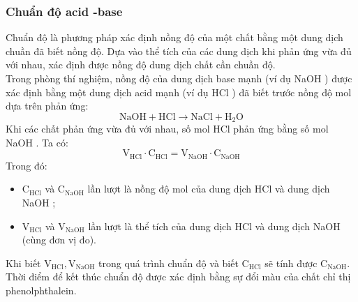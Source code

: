 \subsubsection{Chuẩn độ acid -base}
Chuẩn độ là phương pháp xác định nồng độ của một chất bằng một dung dịch chuần đã biết nồng độ. Dựa vào thể tích của các dung dịch khi phản ứng vừa đủ với nhau, xác định được nồng độ dung dịch chất cần chuần độ.
\\
Trong phòng thí nghiệm, nồng độ của dung dịch base mạnh (ví dụ NaOH ) được xác định bằng một dung dịch acid mạnh (ví dụ HCl ) đã biết trước nồng độ mol dựa trên phản ứng:
\[
\mathrm{NaOH}+\mathrm{HCl} \longrightarrow \mathrm{NaCl}+\mathrm{H}_2 \mathrm{O}
\]
Khi các chất phản ứng vừa đủ với nhau, số mol HCl phản ứng bằng số mol NaOH .
Ta có:
\[
\mathrm{V}_{\mathrm{HCl}} \cdot \mathrm{C}_{\mathrm{HCl}}=\mathrm{V}_{\mathrm{NaOH}} \cdot \mathrm{C}_{\mathrm{NaOH}}
\]
Trong đó:
	\begin{itemize}
		\item $\mathrm{C}_{\mathrm{HCl}}$ và $\mathrm{C}_{\mathrm{NaOH}}$ lần lượt là nồng độ mol của dung dịch HCl và dung dịch NaOH ;
		\item $\mathrm{V}_{\mathrm{HCl}}$ và $\mathrm{V}_{\mathrm{NaOH}}$ lần lượt là thể tích của dung dịch HCl và dung dịch NaOH (cùng đơn vị đo).
	\end{itemize}
Khi biết $\mathrm{V}_{\mathrm{HCl}}, \mathrm{V}_{\mathrm{NaOH}}$ trong quá trình chuẩn độ và biết $\mathrm{C}_{\mathrm{HCl}}$ sẽ tính được $\mathrm{C}_{\mathrm{NaOH}}$.\\
Thời điểm để kết thúc chuẩn độ được xác định bằng sự đổi màu của chất chỉ thị phenolphthalein.
